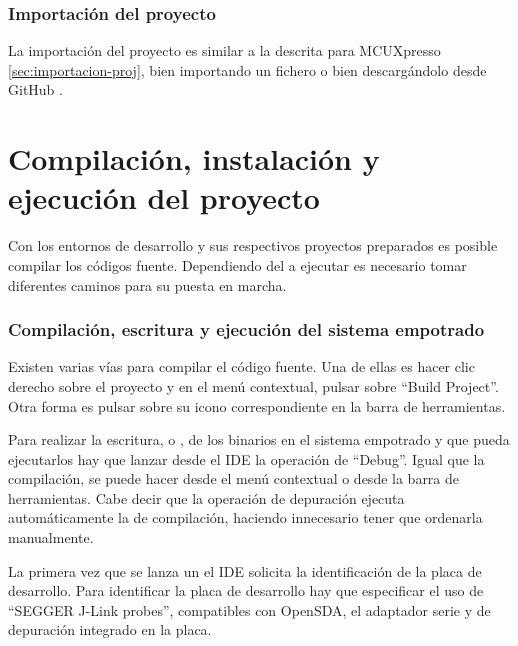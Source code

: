 \subsubsection{Importación del proyecto} \label{sec:importacion-proj-ee}
La importación del proyecto es similar a la descrita para MCUXpresso
\ref{sec:importacion-proj}, bien importando un fichero o bien descargándolo
desde GitHub \cite{webpage:repo-aw}.


\clearpage



\section{Compilación, instalación y ejecución del proyecto} \label{sec:exe}
Con los entornos de desarrollo y sus respectivos proyectos preparados es posible
compilar los códigos fuente. Dependiendo del  a ejecutar
es necesario tomar diferentes caminos para su puesta en marcha.


\subsubsection{Compilación, escritura y ejecución del sistema empotrado}
\label{sec:exe-se}
Existen varias vías para compilar el código fuente. Una de ellas es hacer clic
derecho sobre el proyecto y en el menú contextual, pulsar sobre ``Build
Project''. Otra forma es pulsar sobre su icono correspondiente en la barra de
herramientas.

Para realizar la escritura, o , de los binarios en el
sistema empotrado y que pueda ejecutarlos hay que lanzar desde el IDE la
operación de ``Debug''. Igual que la compilación, se puede hacer desde el menú
contextual o desde la barra de herramientas. Cabe decir que la operación de
depuración ejecuta automáticamente la de compilación, haciendo innecesario tener
que ordenarla manualmente.

La primera vez que se lanza un  el IDE solicita la
identificación de la placa de desarrollo. Para identificar la placa de
desarrollo hay que especificar el uso de ``SEGGER J-Link probes'', 
compatibles con OpenSDA, el adaptador serie y de depuración integrado en la
placa. 



